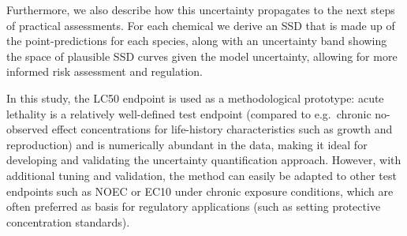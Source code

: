 Furthermore, we also describe how this uncertainty propagates to the next steps of practical assessments. For each chemical we derive an SSD that is made up of the point-predictions for each species, along with an uncertainty band showing the space of plausible SSD curves given the model uncertainty, allowing for more informed risk assessment and regulation.

In this study, the LC50 endpoint is used as a methodological prototype: acute lethality is a relatively well-defined test endpoint (compared to e.g.\ chronic no-observed effect concentrations for life-history characteristics such as growth and reproduction) and is numerically abundant in the data, making it ideal for developing and validating the uncertainty quantification approach. However, with additional tuning and validation, the method can easily be adapted to other test endpoints such as NOEC or EC10 under chronic exposure conditions, which are often preferred as basis for regulatory applications (such as setting protective concentration standards).